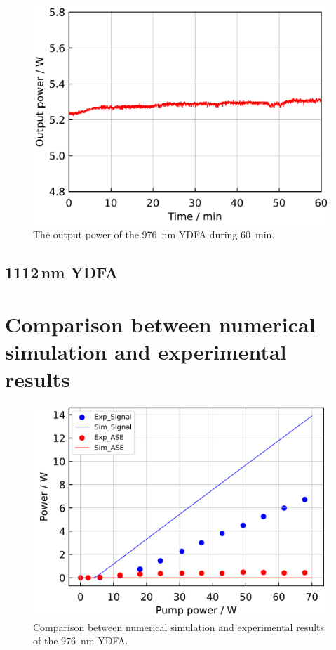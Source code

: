 \documentclass{osa-article}
\begin{document}
\begin{figure}[h!]
  \centering
  \begin{minipage}[b]{0.5\linewidth}
    \centering
    \includegraphics[keepaspectratio, width=0.9\linewidth]{./Figure/DCF-YB-20-128P-FAC172mm_SignalLongTermStability_915Pump70W976Seed0.24W_Exp}
  \end{minipage}
  \caption{The output power of the \SI{976}{\nm} YDFA during \SI{60}{\minute}.}
  \label{fig:LongTermStabilityOfCORACTIVE976YDFA}
\end{figure}


\subsection{1112\,nm YDFA}


\section{Comparison between numerical simulation and experimental results} \label{sec:Discussion}
\begin{figure}[h!]
  \centering
  \begin{minipage}[b]{0.5\linewidth}
    \centering
    \includegraphics[keepaspectratio, width=0.9\linewidth]{./Figure/CompareSimAndExp_Yb1200-20-125DC-PM438mm_915Pump976Seed0.24W.pdf}
  \end{minipage}
  \caption{Comparison between numerical simulation and experimental results of the \SI{976}{\nm} YDFA.}
  \label{fig:ComparisonBetweenSimAndExpOf976YDFA}
\end{figure}
\end{document}
